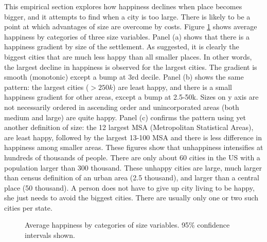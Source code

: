 \documentclass[12pt, letterpaper]{article}
\begin{document}
\begin{spacing}{1.9}
This empirical section explores how happiness declines when  place
 becomes bigger, and it attempts to find when a city is too large. There is likely to be a point at which advantages of size are overcome by
costs. 
 Figure \ref{desSta} shows 
average happiness by categories of three size variables. Panel (a) shows
that there is a happiness gradient by
size of the settlement. As \citet{fischer73}
suggested, it is clearly the biggest cities that are much less happy
than all smaller places.  In other words, the largest decline
in happiness is observed for the largest cities. The gradient is smooth (monotonic) except a bump at  3rd decile.
  Panel (b) shows the same
pattern:  the largest cities ($>250k$) are
least happy, and there is a small happiness gradient for other areas, except a
bump at 2.5-50k. Sizes  on y axis
  are not necessarily ordered in ascending order and unincorporated areas (both
  medium and large) are quite happy.
 Panel (c) confirms the pattern 
using yet another definition of size: 
 the 12 largest MSA (Metropolitan Statistical Areas),  are least happy, followed by the largest 13-100 MSA 
and there is less difference in happiness among smaller areas.
 These figures show that unhappiness intensifies at
 hundreds of thousands of people. There are only about 60 cities in the US with
 a population larger than 300 thousand. These unhappy cities are large, much larger than census definition of an urban area (2.5 thousand), and
  larger than  a central place (50 thousand).  A
  person does not have to give up city living to be happy, she just
  needs to avoid the biggest cities. There are usually only one or two
  such cities per state.%


\begin{figure}%
    \centering
    \caption{Average happiness by categories of size variables. 95\% confidence
      intervals shown.}%
    \label{desSta}%
\end{figure}


\end{spacing}
\end{document}
